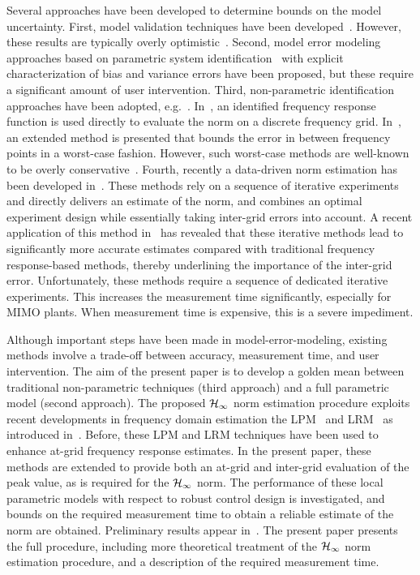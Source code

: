 Several approaches have been developed to determine bounds on the model uncertainty. 
First, model validation techniques have been developed~\citep[see e.g.][]{Smith1992,Xu1999}.
However, these results are typically overly optimistic~\citep{Oomen2009UncEstim}.
Second, model error modeling approaches based on parametric system identification~\citep{Ljung1999MEM} with explicit characterization of bias and variance errors have been proposed, but these require a significant amount of user intervention.
Third, non-parametric identification approaches have been adopted, e.g.~\citep{vandeWal2002,deVries1994}. 
In~\citep{vandeWal2002}, an identified frequency response function is used directly to evaluate the \Hinf{} norm on a discrete frequency grid. 
In~\citep{deVries1994}, an extended method is presented that bounds the error in between frequency points in a worst-case fashion. 
However, such worst-case methods are well-known to be overly conservative~\citep[Section 9.5.2]{Vinnicombe2001}. 
Fourth, recently a data-driven \Hinf{} norm estimation has been developed in~\citep{Wahlberg2010,Oomen2014ILH}.
These methods rely on a sequence of iterative experiments and directly delivers an estimate of the \Hinf{} norm, and combines an optimal experiment design while essentially taking inter-grid errors into account.
A recent application of this method in~\citep{Oomen2014ILH} has revealed that these iterative methods lead to significantly more accurate \Hinf{} estimates compared with traditional frequency response-based methods, thereby underlining the importance of the inter-grid error.
Unfortunately, these methods require a sequence of dedicated iterative experiments.
This increases the measurement time significantly, especially for \gls{MIMO} plants.
When measurement time is expensive, this is a severe impediment.

Although important steps have been made in model-error-modeling, existing methods involve a trade-off between accuracy, measurement time, and user intervention.
The aim of the present paper is to develop a golden mean between traditional non-parametric techniques (third approach) and a full parametric model (second approach).
The proposed $\mathcal{H}_{\infty}{}$ norm estimation procedure exploits recent developments in frequency domain estimation the \gls{LPM}~\citep{Schoukens2009LPM} and \gls{LRM}~\citep{McKelvey2012LRM} as introduced in~\citep{Geerardyn2014IFAC,Geerardyn2014ISMA}.
Before, these \gls{LPM} and \gls{LRM} techniques have been used to enhance at-grid frequency response estimates.
In the present paper, these methods are extended to provide both an at-grid and inter-grid evaluation of the peak value, as is required for the $\mathcal{H}_{\infty}{}$ norm. 
The performance of these local parametric models with respect to robust control design is investigated, and bounds on the required measurement time to obtain a reliable estimate of the \Hinf{} norm are obtained.
Preliminary results appear in~\citep{Geerardyn2014IFAC,Geerardyn2014ISMA}.
The present paper presents the full procedure, including more theoretical treatment of the $\mathcal{H}_{\infty}{}$ norm estimation procedure, and a description of the required measurement time.

